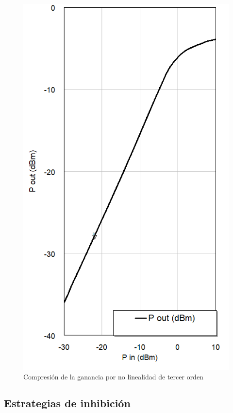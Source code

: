 \documentclass[12pt]{report}
\begin{document}
\begin{figure}[htb]
	\centering
	\includegraphics[scale=0.4]{no_linealidad_e_tercer_orden.png}
	\caption{Compresión de la ganancia por no linealidad de tercer orden}
	\label{no_linealidad_e_tercer_orden}
\end{figure}

\subsection{Estrategias de inhibición}
\end{document}
